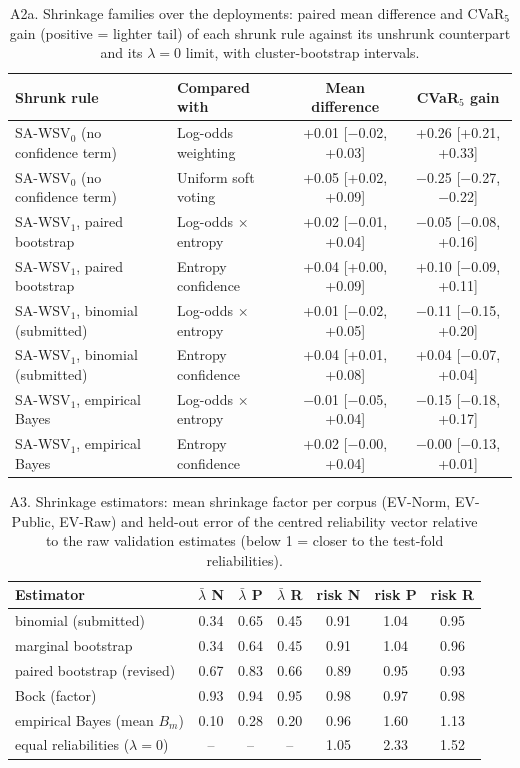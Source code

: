 \begin{table}[!htbp]\centering\scriptsize
\caption*{A2a. Shrinkage families over the deployments: paired mean difference and CVaR$_5$ gain (positive = lighter tail) of each shrunk rule against its unshrunk counterpart and its $\lambda=0$ limit, with cluster-bootstrap intervals.}
\begin{tabular}{llcc}\toprule
Shrunk rule & Compared with & Mean difference & CVaR$_5$ gain \\ \midrule
SA-WSV$_0$ (no confidence term) & Log-odds weighting & +0.01 [$-$0.02, +0.03] & +0.26 [+0.21, +0.33] \\
SA-WSV$_0$ (no confidence term) & Uniform soft voting & +0.05 [+0.02, +0.09] & $-$0.25 [$-$0.27, $-$0.22] \\
SA-WSV$_1$, paired bootstrap & Log-odds $\times$ entropy & +0.02 [$-$0.01, +0.04] & $-$0.05 [$-$0.08, +0.16] \\
SA-WSV$_1$, paired bootstrap & Entropy confidence & +0.04 [+0.00, +0.09] & +0.10 [$-$0.09, +0.11] \\
SA-WSV$_1$, binomial (submitted) & Log-odds $\times$ entropy & +0.01 [$-$0.02, +0.05] & $-$0.11 [$-$0.15, +0.20] \\
SA-WSV$_1$, binomial (submitted) & Entropy confidence & +0.04 [+0.01, +0.08] & +0.04 [$-$0.07, +0.04] \\
SA-WSV$_1$, empirical Bayes & Log-odds $\times$ entropy & $-$0.01 [$-$0.05, +0.04] & $-$0.15 [$-$0.18, +0.17] \\
SA-WSV$_1$, empirical Bayes & Entropy confidence & +0.02 [$-$0.00, +0.04] & $-$0.00 [$-$0.13, +0.01] \\
\bottomrule\end{tabular}\end{table}

\begin{table}[!htbp]\centering\scriptsize
\caption*{A3. Shrinkage estimators: mean shrinkage factor per corpus (EV-Norm, EV-Public, EV-Raw) and held-out error of the centred reliability vector relative to the raw validation estimates (below 1 = closer to the test-fold reliabilities).}
\begin{tabular}{lcccccc}\toprule
Estimator & $\bar\lambda$ N & $\bar\lambda$ P & $\bar\lambda$ R & risk N & risk P & risk R \\ \midrule
binomial (submitted) & 0.34 & 0.65 & 0.45 & 0.91 & 1.04 & 0.95 \\
marginal bootstrap & 0.34 & 0.64 & 0.45 & 0.91 & 1.04 & 0.96 \\
paired bootstrap (revised) & 0.67 & 0.83 & 0.66 & 0.89 & 0.95 & 0.93 \\
Bock (factor) & 0.93 & 0.94 & 0.95 & 0.98 & 0.97 & 0.98 \\
empirical Bayes (mean $B_m$) & 0.10 & 0.28 & 0.20 & 0.96 & 1.60 & 1.13 \\
equal reliabilities ($\lambda=0$) & -- & -- & -- & 1.05 & 2.33 & 1.52 \\
\bottomrule\end{tabular}\end{table}

